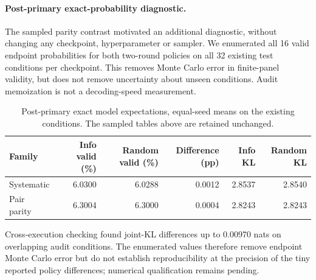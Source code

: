 \paragraph{Post-primary exact-probability diagnostic.}
The sampled parity contrast motivated an additional diagnostic, without changing any checkpoint, hyperparameter or sampler. We enumerated all 16 valid endpoint probabilities for both two-round policies on all 32 existing test conditions per checkpoint. This removes Monte Carlo error in finite-panel validity, but does not remove uncertainty about unseen conditions. Audit memoization is not a decoding-speed measurement.
\begin{table}[htbp]
\centering\small
\caption{Post-primary exact model expectations, equal-seed means on the existing conditions. The sampled tables above are retained unchanged.}
\label{tab:train04exact}
\begin{tabular}{@{}lrrrrr@{}}
\toprule
Family & Info valid (\%) & Random valid (\%) & Difference (pp) & Info KL & Random KL\\
\midrule
Systematic & 6.0300 & 6.0288 & 0.0012 & 2.8537 & 2.8540\\
Pair parity & 6.3004 & 6.3000 & 0.0004 & 2.8243 & 2.8243\\
\bottomrule
\end{tabular}
\end{table}

Cross-execution checking found joint-KL differences up to 0.00970 nats on overlapping audit conditions. The enumerated values therefore remove endpoint Monte Carlo error but do not establish reproducibility at the precision of the tiny reported policy differences; numerical qualification remains pending.
